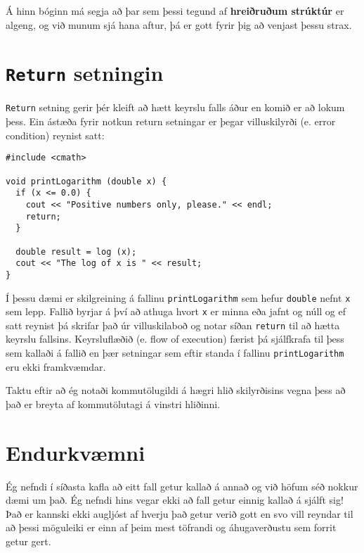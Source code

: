 
Á hinn bóginn má segja að þar sem þessi tegund af {\bf hreiðruðum strúktúr} er algeng, og við munum sjá hana aftur, þá er gott fyrir þig að venjast þessu strax.

\section{{\tt Return} setningin}

{\tt Return} setning gerir þér kleift að hætt keyrslu falls áður en komið er að lokum þess.
Ein ástæða fyrir notkun return setningar er þegar villuskilyrði (e. error condition) reynist satt:

\begin{verbatim}
#include <cmath>

void printLogarithm (double x) {
  if (x <= 0.0) {
    cout << "Positive numbers only, please." << endl;
    return;
  }

  double result = log (x);
  cout << "The log of x is " << result;
}
\end{verbatim}
%
Í þessu dæmi er skilgreining á fallinu {\tt printLogarithm} sem hefur {\tt double} nefnt {\tt x} sem lepp.
Fallið byrjar á því að athuga hvort {\tt x} er minna eða jafnt og núll og ef satt reynist þá skrifar það úr villuskilaboð
og notar síðan {\tt return} til að hætta keyrslu fallsins.
Keyrsluflæðið (e. flow of execution) færist þá sjálfkrafa til þess sem kallaði á fallið en þær setningar sem eftir standa í fallinu {\tt printLogarithm} eru ekki framkvæmdar.

Taktu eftir að ég notaði kommutölugildi á hægri hlið skilyrðisins vegna þess að það er breyta af kommutölutagi á vinstri hliðinni.


\section{Endurkvæmni}
\label{recursion}

Ég nefndi í síðasta kafla að eitt fall getur kallað á annað og við höfum séð nokkur dæmi um það.
Ég nefndi hins vegar ekki að fall getur einnig kallað á sjálft sig!
Það er kannski ekki augljóst af hverju það getur verið gott en svo vill reyndar til að þessi möguleiki er 
einn af þeim mest töfrandi og áhugaverðustu sem forrit getur gert.

